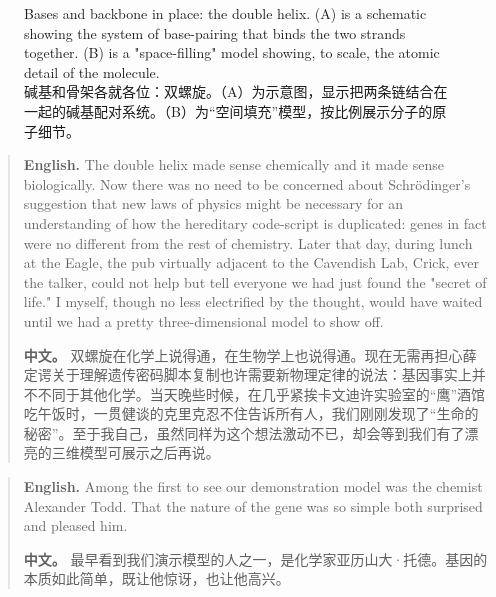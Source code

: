\begin{figure}[htbp]
\centering
{}
\hfill
{}
\caption{Bases and backbone in place: the double helix. (A) is a schematic showing the system of base-pairing that binds the two strands together. (B) is a "space-filling" model showing, to scale, the atomic detail of the molecule.\\碱基和骨架各就各位：双螺旋。（A）为示意图，显示把两条链结合在一起的碱基配对系统。（B）为“空间填充”模型，按比例展示分子的原子细节。}
\end{figure}

\begin{quote}
\noindent\textbf{English.} The double helix made sense chemically and it made sense biologically. Now there was no need to be concerned about Schrödinger's suggestion that new laws of physics might be necessary for an understanding of how the hereditary code-script is duplicated: genes in fact were no different from the rest of chemistry. Later that day, during lunch at the Eagle, the pub virtually adjacent to the Cavendish Lab, Crick, ever the talker, could not help but tell everyone we had just found the "secret of life." I myself, though no less electrified by the thought, would have waited until we had a pretty three-dimensional model to show off.

\smallskip
\noindent\textbf{中文。} 双螺旋在化学上说得通，在生物学上也说得通。现在无需再担心薛定谔关于理解遗传密码脚本复制也许需要新物理定律的说法：基因事实上并不不同于其他化学。当天晚些时候，在几乎紧挨卡文迪许实验室的“鹰”酒馆吃午饭时，一贯健谈的克里克忍不住告诉所有人，我们刚刚发现了“生命的秘密”。至于我自己，虽然同样为这个想法激动不已，却会等到我们有了漂亮的三维模型可展示之后再说。
\end{quote}

\begin{quote}
\noindent\textbf{English.} Among the first to see our demonstration model was the chemist Alexander Todd. That the nature of the gene was so simple both surprised and pleased him.

\smallskip
\noindent\textbf{中文。} 最早看到我们演示模型的人之一，是化学家亚历山大·托德。基因的本质如此简单，既让他惊讶，也让他高兴。
\end{quote}


